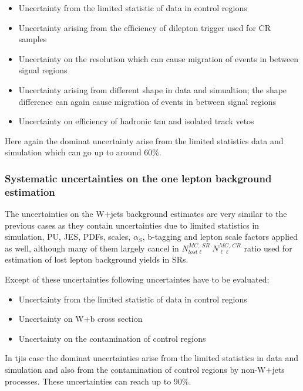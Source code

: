 \begin{itemize} 
\item Uncertainty from the limited statistic of data in control regions
\item Uncertainty arising from the efficiency of dilepton trigger used for CR samples
\item Uncertainty on the \MET resolution which can cause migration of events in between signal regions
\item Uncertainty arising from different \MET shape in data and simualtion; the shape difference can again cause migration of events in between signal regions
\item Uncertainty on efficiency of hadronic tau and isolated track vetos %
\end{itemize}


Here again the dominat uncertainty arise from the limited statistics data and simulation which can go up to around 60\%.


\subsubsection{Systematic uncertainties on the one lepton background estimation}

The uncertainties on the W+jets background estimates are very similar to the previous cases as they contain uncertainties due to limited statistics in simulation, PU, JES, PDFs, scales, $\alpha_{S}$, b-tagging and lepton scale factors  applied as well, although many of them largely cancel in $N^{MC,~SR}_{lost \ell}\ N^{MC,~CR}_{\ell\ell}$ ratio used for estimation of lost lepton background yields in SRs.

Except of these uncertainties following uncertaintes have to be evaluated:

\begin{itemize} 
\item Uncertainty from the limited statistic of data in control regions
\item Uncertainty on W+b cross section
\item Uncertainty on the contamination of control regions
\end{itemize}

In tjis case the dominat uncertainties arise from the limited statistics in data and simulation and also from the contamination of control regions by non-W+jets processes. These uncertainties can reach up to 90\%.

